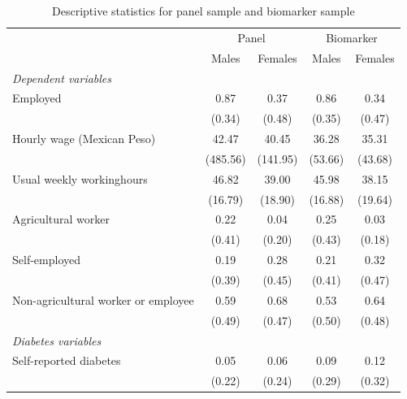 \documentclass[12pt,english]{article}
\begin{document}
\begin{table}
\caption{\label{tab:Pooled-sample-characteristics}Descriptive statistics for panel sample and biomarker sample}
\begin{adjustbox}{max width=0.9\textwidth, center}
{
\def\sym#1{\ifmmode^{#1}\else\(^{#1}\)\fi}
\begin{tabular}{l*{4}{c}}
\toprule
                    &\multicolumn{2}{c}{Panel}&\multicolumn{2}{c}{Biomarker}\\\cmidrule(lr){2-3}\cmidrule(lr){4-5}
                    &\multicolumn{1}{c}{Males}&\multicolumn{1}{c}{Females}&\multicolumn{1}{c}{Males}&\multicolumn{1}{c}{Females}\\
                    \midrule
\hspace*{10mm}\emph{Dependent variables} \\
Employed            &        0.87&        0.37&        0.86&        0.34\\
                    &      (0.34)&      (0.48)&      (0.35)&      (0.47)\\
Hourly wage (Mexican Peso)        &       42.47&       40.45&       36.28&       35.31\\
                    &    (485.56)&    (141.95)&     (53.66)&     (43.68)\\
Usual weekly workinghours&       46.82&       39.00&       45.98&       38.15\\
                    &     (16.79)&     (18.90)&     (16.88)&     (19.64)\\
Agricultural worker &        0.22&        0.04&        0.25&        0.03\\
                    &      (0.41)&      (0.20)&      (0.43)&      (0.18)\\
Self-employed       &        0.19&        0.28&        0.21&        0.32\\
                    &      (0.39)&      (0.45)&      (0.41)&      (0.47)\\
Non-agricultural worker or employee&        0.59&        0.68&        0.53&        0.64\\
					&      (0.49)&      (0.47)&      (0.50)&      (0.48)\\
\hspace*{10mm}\emph{Diabetes variables} \\
Self-reported diabetes  &        0.05&        0.06&        0.09&        0.12\\
                    &      (0.22)&      (0.24)&      (0.29)&      (0.32)\\

\end{tabular}}
\end{adjustbox}
\end{table}
\end{document}
